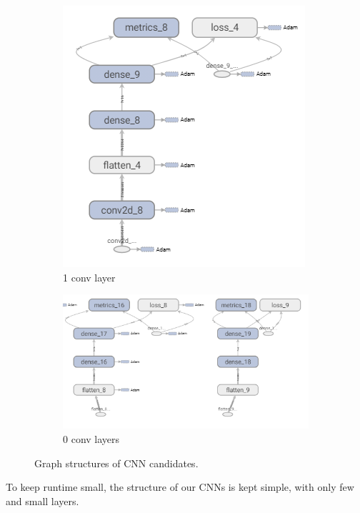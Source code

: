 \begin{figure}
\begin{subfigure}[b]{0.3\linewidth}
		\includegraphics[width=\linewidth]{plots/cnn-candidates-1-conv.png}
		\caption{1 conv layer}
	\end{subfigure}
	\begin{subfigure}[b]{0.3\linewidth}
		\includegraphics[width=\linewidth]{plots/cnn-candidates-0-conv.png}
		\caption{0 conv layers}
	\end{subfigure}
	\caption{Graph structures of \gls{CNN} candidates.}
	\label{fig:cnn-structure-abstract}
\end{figure}

To keep runtime small, the structure of our \glspl{CNN} is kept simple, with only few and small layers.

